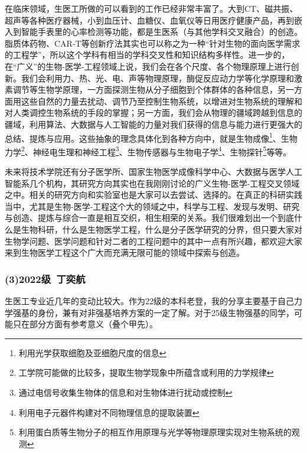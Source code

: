 \documentclass[11pt,oneside]{book}
\begin{document}
\vspace{10pt}

在临床领域，生医工所做的可以看到的工作已经非常丰富了。大到CT、磁共振、超声等各种医疗器械，小到血压计、血糖仪、血氧仪等日用医疗健康产品，再到嵌入到智能手表里的心率检测等功能，都是生医系（与其他学科交叉融合）的创造。脂质体药物、CAR-T等创新疗法其实也可以称之为一种“针对生物的面向医学需求的工程学”，所以这个学科有相当的学科交叉性和知识结构多样性。进一步的，在“广义”的生物-医学-工程领域上说，我们会在各个尺度、各个物理原理上进行创新。我们会利用力、热、光、电、声等物理原理，酶促反应动力学等化学原理和激素调节等生物学原理，一方面探测生物从分子细胞到个体群体的各种信息，另一方面用这些自然的力量去扰动、调节乃至控制生物系统，以增进对生物系统的理解和对人类调控生物系统的手段的掌握；另一方面，我们会从物理的疆域跨越到信息的疆域，利用算法、大数据与人工智能的力量对我们获得的信息与能力进行更强大的总结、提炼与应用。这些抽象的理念具体化到各种方向中，就是生物成像\footnote{利用光学获取细胞及亚细胞尺度的信息}、生物力学\footnote{工学院可能做的比较多，提取生物学现象中所蕴含或利用的力学规律}、神经电生理和神经工程\footnote{通过电信号收集生物体的信息和对生物体进行扰动或控制}、生物传感器与生物电子学\footnote{利用电子元器件构建对不同物理信息的提取装置}、生物探针\footnote{利用蛋白质等生物分子的相互作用原理与光学等物理原理实现对生物系统的观测}等等。

\vspace{10pt}

未来将技术学院还有分子医学所、国家生物医学成像科学中心、大数据与医学人工智能系几个机构，其研究方向其实也在我刚刚讨论的广义生物-医学-工程交叉领域之中。相关的研究方向和实验室也是大家可以去尝试、选择的。在真正的科研实践当中，尤其是生物-医学-工程这个大的领域之中，科学与工程、发现与发明、研究与创造、提炼与综合一直是相互交织，相生相荣的关系。我们很难划出一个到底什么是生物科研，什么是生物医学工程，什么是分子医学研究的分界，但只要大家对生物学问题、医学问题和针对二者的工程问题中的其中一点有所兴趣，都欢迎大家来到生物医学工程这个广大而充满无限可能的领域中探索与创造。

\subsubsection{(3)2022级\ 丁奕航}

生医工专业近几年的变动比较大。作为22级的本科老登，我的分享主要基于自己力学强基的身份，兼有对非强基培养方案的一定了解。对于25级生物强基的同学，可能只在部分方面有参考意义（叠个甲先）。

\vspace{10pt}
\end{document}
